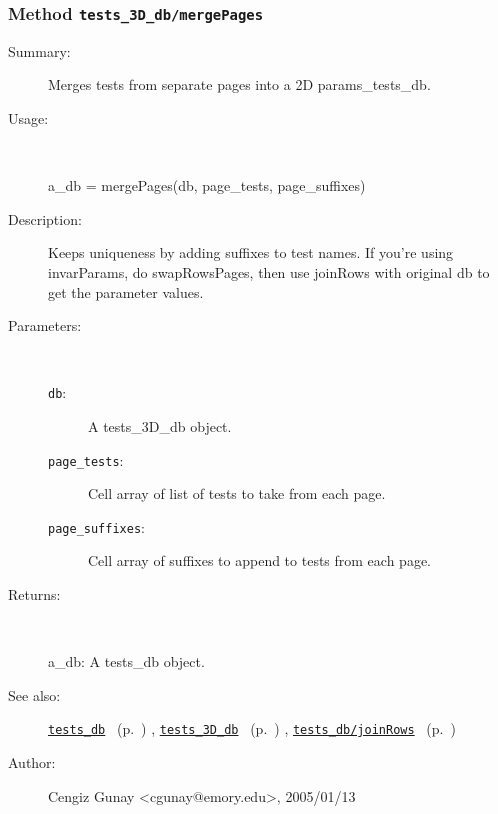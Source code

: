 \subsubsection[Method \texttt{mergePages}]{Method \texttt{tests\_3D\_db/mergePages}}%
%
\label{ref_tests_3D_db__mergePages}%
\hypertarget{ref_tests_3D_db__mergePages}{}%
\begin{description}
\item[Summary:]Merges tests from separate pages into a 2D params\_tests\_db.
%
\item[Usage:]~%
\begin{lyxcode}%
a\_db = mergePages(db, page\_tests, page\_suffixes)
%
\end{lyxcode}%
%
\item[Description:]%
Keeps uniqueness by adding suffixes to test names.
 If you're using invarParams, do swapRowsPages, then use joinRows with original db to get
 the parameter values.
\item[Parameters:]~
\begin{description}%
\item[\texttt{db}:]
 A tests\_3D\_db object.
\item[\texttt{page\_tests}:]
 Cell array of list of tests to take from each page.
\item[\texttt{page\_suffixes}:]
 Cell array of suffixes to append to tests from each page.
\end{description}%
%
\item[Returns:
]~

	a\_db: A tests\_db object.
%
%
\item[See also:]%
\hyperlink{ref_tests_db}{\texttt{tests\_db}}%
\ (p.~\pageref{ref_tests_db})%
%
, \hyperlink{ref_tests_3D_db}{\texttt{tests\_3D\_db}}%
\ (p.~\pageref{ref_tests_3D_db})%
%
, \hyperlink{ref_tests_db__joinRows}{\texttt{tests\_db/joinRows}}%
\ (p.~\pageref{ref_tests_db__joinRows})%
%
%
\item[Author:]%
Cengiz Gunay <cgunay@emory.edu>, 2005/01/13
%
\end{description}
\methodline%
